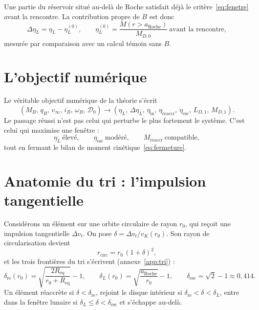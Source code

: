 \documentclass[11pt,a4paper,openany]{report}
\newcommand{\Req}{R_{\mathrm{eq}}}
\newcommand{\aR}{a_{\mathrm{Roche}}}
\begin{document}
Une partie du réservoir situé au-delà de Roche satisfait déjà le critère~\eqref{eq:fenetre} avant la
rencontre. La contribution propre de $B$ est donc
\begin{equation}
\Delta\eta_L=\eta_L-\eta_L^{(0)},\qquad
\eta_L^{(0)}=\frac{M(r>\aR)}{M_{D,0}}\ \text{avant la rencontre},
\label{eq:DeltaetaL}
\end{equation}
mesurée par comparaison avec un calcul témoin sans $B$.

\section{L'objectif numérique}

Le véritable objectif numérique de la théorie s'écrit
\begin{equation}
\boxed{\;\left(M_B,\,q_B,\,v_\infty,\,i_B,\,\omega_B,\,\mathcal{D}_0\right)\longrightarrow
\left(\eta_L,\,\Delta\eta_L,\,\eta_{\mathrm{in}},\,\eta_{\mathrm{reaccr}},\,\eta_{\mathrm{esc}},\,
L_{D,1},\,M_{D,1}\right).\;}
\label{eq:objectif}
\end{equation}
Le passage réussi n'est pas celui qui perturbe le plus fortement le système. C'est celui qui
maximise une fenêtre :
\begin{equation}
\boxed{\;\eta_L\ \text{élevé},\qquad \eta_{\mathrm{esc}}\ \text{modéré},\qquad
M_{\mathrm{reaccr}}\ \text{compatible},\;}
\label{eq:fenetre-succes}
\end{equation}
tout en fermant le bilan de moment cinétique~\eqref{eq:fermeture}.

\section{Anatomie du tri : l'impulsion tangentielle}

Considérons un élément sur une orbite circulaire de rayon $r_0$, qui reçoit une impulsion
tangentielle $\Delta v_t$. On pose $\delta=\Delta v_t/v_K(r_0)$. Son rayon de circularisation
devient
\begin{equation}
r_{\mathrm{circ}}=r_0\,(1+\delta)^2,
\label{eq:rcirc-delta}
\end{equation}
et les trois frontières du tri s'écrivent (annexe~\ref{app:tri}) :
\begin{equation}
\delta_{\mathrm{re}}(r_0)=\sqrt{\frac{2\Req}{r_0+\Req}}-1,\qquad
\delta_L(r_0)=\sqrt{\frac{\aR}{r_0}}-1,\qquad
\delta_{\mathrm{esc}}=\sqrt2-1\approx0{,}414.
\label{eq:frontieres}
\end{equation}
Un élément réaccrète si $\delta<\delta_{\mathrm{re}}$, rejoint le disque intérieur si
$\delta_{\mathrm{re}}<\delta<\delta_L$, entre dans la fenêtre lunaire si
$\delta_L\le\delta<\delta_{\mathrm{esc}}$ et s'échappe au-delà.
\end{document}
